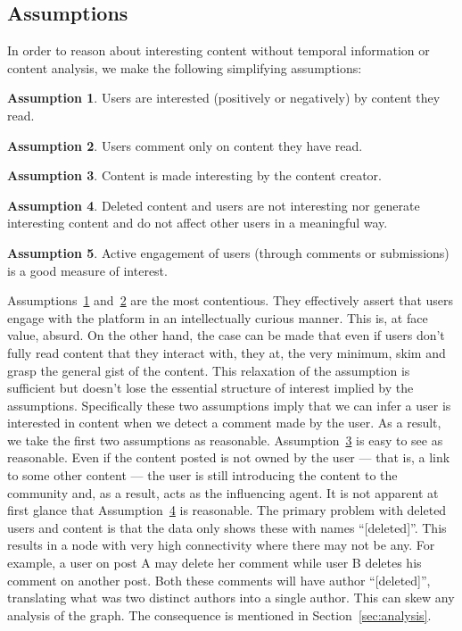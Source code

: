 \documentclass[letterpaper, 10 pt, conference]{ieeeconf}
\theoremstyle{definition}
\newtheorem{assumption}{Assumption}[section]
\begin{document}
\subsection{Assumptions}
In order to reason about interesting content without temporal information or content analysis, we make the following simplifying assumptions:

\begin{assumption}
  Users are interested (positively or negatively) by content they read.
  \label{assume:1}
\end{assumption} 

\begin{assumption}
  Users comment only on content they have read.
  \label{assume:2}
\end{assumption}

\begin{assumption}
  Content is made interesting by the content creator.
  \label{assume:3}
\end{assumption}

\begin{assumption}
  Deleted content and users are not interesting nor generate interesting content and do not affect other users in a meaningful way.
  \label{assume:4}
\end{assumption}

\begin{assumption}
  Active engagement of users (through comments or submissions) is a good measure of interest.
  \label{assume:5}
\end{assumption}

Assumptions~\ref{assume:1} and~\ref{assume:2} are the most contentious. They effectively assert that users engage with the platform in an intellectually curious manner. This is, at face value, absurd. On the other hand, the case can be made that even if users don't fully read content that they interact with, they at, the very minimum, skim and grasp the general gist of the content. This relaxation of the assumption is sufficient but doesn't lose the essential structure of interest implied by the assumptions. Specifically these two assumptions imply that we can infer a user is interested in content when we detect a comment made by the user. As a result, we take the first two assumptions as reasonable. Assumption~\ref{assume:3} is easy to see as reasonable. Even if the content posted is not owned by the user --- that is, a link to some other content --- the user is still introducing the content to the community and, as a result, acts as the influencing agent. It is not apparent at first glance that Assumption~\ref{assume:4} is reasonable. The primary problem with deleted users and content is that the data only shows these with names ``[deleted]''. This results in a node with very high connectivity where there may not be any. For example, a user on post A may delete her comment while user B deletes his comment on another post. Both these comments will have author ``[deleted]'', translating what was two distinct authors into a single author. This can skew any analysis of the graph. The consequence is mentioned in Section~\ref{sec:analysis}. 
\end{document}

